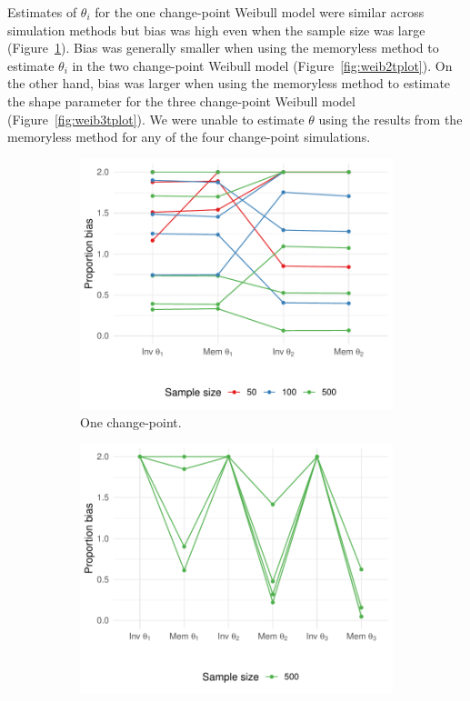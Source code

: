 \begin{appendix}
Estimates of $\theta_i$ for the one change-point Weibull model were similar across simulation methods but bias was high even when the sample size was large (Figure~\ref{fig:weib1tplot}). Bias was generally smaller when using the memoryless method to estimate $\theta_i$ in the two change-point Weibull model (Figure~\ref{fig:weib2tplot}). On the other hand, bias was larger when using the memoryless method to estimate the shape parameter for the three change-point Weibull model (Figure~\ref{fig:weib3tplot}). We were unable to estimate $\theta$ using the results from the memoryless method for any of the four change-point simulations.

\begin{figure}[ht]
    \centering
     \begin{subfigure}[b]{0.45\textwidth}
         \centering
         \includegraphics[width=\textwidth]{weib1_tplot.pdf}
         \caption{One change-point.}
         \label{fig:weib1tplot}
     \end{subfigure}
     \hfill
    \begin{subfigure}[b]{0.45\textwidth}
         \centering
         \includegraphics[width=\textwidth]{weib2_tplot.pdf}

\end{subfigure}
\end{figure}
\end{appendix}
